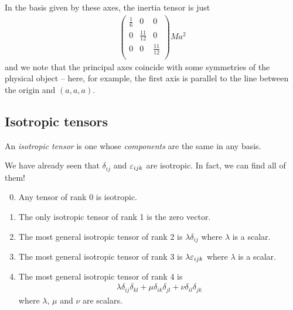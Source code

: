 \documentclass{../template/note}
\begin{document}
\begin{example*}[hard]
        In the basis given by these axes, the inertia tensor is just
        \begin{align*}
            \begin{pmatrix}
                \frac 1 6 & 0 & 0 \\
                0 & \frac {11}{12} & 0 \\
                0 & 0 & \frac{11}{12} \\
            \end{pmatrix}Ma^2
        \end{align*}
        and we note that the principal axes coincide with some symmetries of the physical object -- here, for example, the first axis is parallel to the line between the origin and \((a, a, a)\).        
    \end{example*}
    
    \subsection{Isotropic tensors}

    \begin{definition*}
        An \emph{isotropic tensor} is one whose \emph{components} are the same in any basis.
    \end{definition*}
    
    We have already seen that \(\delta_{ij}\) and \(\varepsilon_{ijk}\) are isotropic. In fact, we can find all of them!

    \begin{enumerate}
        \setcounter{enumi}{-1}
        \item Any tensor of rank 0 is isotropic.
        \item The only isotropic tensor of rank 1 is the zero vector.
        \item The most general isotropic tensor of rank 2 is \(\lambda \delta_{ij}\) where \(\lambda\) is a scalar.
        \item The most general isotropic tensor of rank 3 is \(\lambda \varepsilon_{ijk}\) where \(\lambda\) is a scalar.
        \item The most general isotropic tensor of rank 4 is
        \begin{align*}
            \lambda \delta_{ij}\delta_{kl} + \mu \delta_{ik}\delta_{jl} + \nu \delta_{il}\delta_{jk}
        \end{align*}
        where \(\lambda\), \(\mu\) and \(\nu\) are scalars.        
    \end{enumerate}
    
\end{document}
